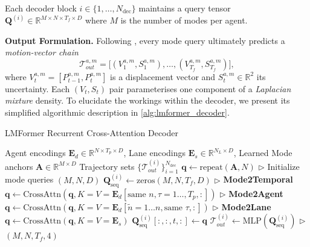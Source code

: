Each decoder block \(i \in \{1, \ldots, N_{\text{dec}}\}\) maintains a query tensor \(\mathbf{Q}^{(i)} \in \mathbb{R}^{M \times N \times T_f \times D}\) where \(M\) is the number of modes per agent.

\textbf{Output Formulation.} Following \cite{lmformerYadav2025}, every mode query ultimately predicts a \emph{motion-vector chain}
\begin{equation}
\mathcal{T}_{out}^{a,m} = \bigl[(V_1^{a,m},S_1^{a,m}),\dots,(V_{T_f}^{a,m},S_{T_f}^{a,m})\bigr],
\end{equation}
where \(V_t^{a,m}=[P_{t-1}^{a,m},P_t^{a,m}]\) is a displacement vector and \(S_t^{a,m}\in\mathbb{R}^{2}\) its uncertainty. Each \( (V_t,S_t) \) pair parameterises one component of a \emph{Laplacian mixture} density. To elucidate the workings within the decoder, we present its simplified algorithmic description in \autoref{alg:lmformer_decoder}.

\begin{algorithm}[H]
\caption{LMFormer Recurrent Cross-Attention Decoder}
\label{alg:lmformer_decoder}
\begin{algorithmic}[1]
\REQUIRE Agent encodings \(\mathbf{E}_d \in \mathbb{R}^{N \times T_{p} \times D}\), Lane encodings \(\mathbf{E}_s \in \mathbb{R}^{N_L \times D}\), Learned Mode anchors \(\mathbf{A} \in \mathbb{R}^{M \times D}\)
\ENSURE Trajectory sets \(\{\mathcal{T}_{out}^{(i)}\}_{i=1}^{N_{\text{dec}}}\)
\STATE \(\mathbf{q} \leftarrow \text{repeat}(\mathbf{A}, N)\) \(\triangleright\) Initialize mode queries \((M, N, D)\)
    \STATE \(\mathbf{Q}_{\text{seq}}^{(i)} \leftarrow \text{zeros}(M, N, T_f, D)\)
        \STATE \(\triangleright\) \textbf{Mode2Temporal}
        \STATE \(\mathbf{q}\leftarrow \text{CrossAttn}(\mathbf{q}, K=V=\mathbf{E}_d[\text{same } n, \tau = 1\dots, T_p, :])\)
        \STATE \(\triangleright\) \textbf{Mode2Agent}
        \STATE \(\mathbf{q}\leftarrow \text{CrossAttn}(\mathbf{q}, K=V=\mathbf{E}_d[\tilde{n}=1\dots n, \text{same } \tau, :])\)
        \STATE \(\triangleright\) \textbf{Mode2Lane}
        \STATE \(\mathbf{q}\leftarrow \text{CrossAttn}(\mathbf{q}, K=V=\mathbf{E}_s)\)
        \STATE \(\mathbf{Q}_{\text{seq}}^{(i)}[:, :, t, :] \leftarrow \mathbf{q}\)
    \ENDFOR
    \STATE \(\mathcal{T}_{out}^{(i)} \leftarrow \text{MLP}(\mathbf{Q}_{\text{seq}}^{(i)})\) \(\triangleright\) \((M, N, T_f, 4)\)
\ENDFOR
\end{algorithmic}
\end{algorithm}

